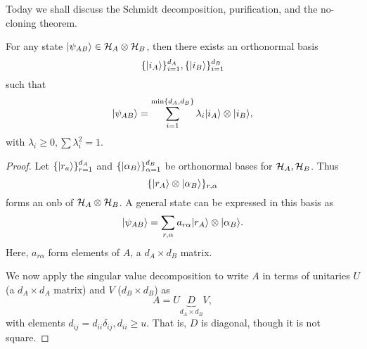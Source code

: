 Today we shall discuss the Schmidt decomposition, purification, and the no-cloning theorem.

\begin{thm}
    For any state $\lvert\psi_{AB}\rangle\in \mathcal H_A \otimes \mathcal H_B$, then there exists an orthonormal basis
    \begin{equation}
        \{\lvert i_A\rangle\}_{i=1}^{d_A},\{\lvert i_B\rangle\}_{i=1}^{d_B}
    \end{equation}
    such that
    \begin{equation}
        \lvert\psi_{AB}\rangle=\sum_{i=1}^{\min\{d_A,d_B\}}\lambda_i \lvert i_A\rangle\otimes \lvert i_B\rangle,
    \end{equation}
    with $\lambda_i \geq 0, \sum \lambda_i^2 = 1$.
\end{thm}
\begin{proof}
    Let $\{\lvert r_a\rangle\}_{r=1}^{d_A}$ and $\{\lvert\alpha_B\rangle\}_{\alpha=1}^{d_B}$ be orthonormal bases for $\mathcal H_A,\mathcal H_B$. Thus
    \begin{equation}
        \{\lvert r_A\rangle\otimes \lvert\alpha_B\rangle\}_{r,\alpha}
    \end{equation}
    forms an onb of $\mathcal H_A \otimes \mathcal H_B$. A general state can be expressed in this basis as
    \begin{equation}
        \lvert\psi_{AB}\rangle=\sum_{r,\alpha} a_{r\alpha} \lvert r_A\rangle \otimes \lvert\alpha_B\rangle.
    \end{equation}
    Here, $a_{r\alpha}$ form elements of $A$, a $d_A\times d_B$ matrix.
    
    We now apply the singular value decomposition to write $A$ in terms of unitaries $U$ (a $d_A \times d_A$ matrix) and $V$ ($d_B\times d_B$) as
    \begin{equation}
        A=U\underbrace{D}_{d_A\times d_B} V,
    \end{equation}
    with elements $d_{ij}=d_{ii}\delta_{ij},d_{ii}\geq u$. That is, $D$ is diagonal, though it is not square.
    

\end{proof}

